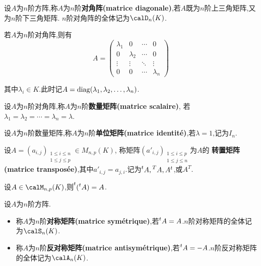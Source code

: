 \begin{deff}
    设$A$为$n$阶方阵,称$A$为$n$阶\textbf{对角阵(matrice diagonale)},若$A$既为$n$阶上三角矩阵,又为$n$阶下三角矩阵.
    $n$阶对角阵的全体记为$\calD_n(K)$.
\end{deff}

\begin{rqq}
    若$A$为$n$阶对角阵,则有
    \[ A = \begin{pmatrix}
        \lambda_{1} & 0 & \cdots & 0 \\
        0 & \lambda_{2} & \cdots & 0 \\
        \vdots & \vdots & \ddots & \vdots \\
        0 & 0 & \cdots & \lambda_{n}
    \end{pmatrix} \]

    其中$\lambda_i \in K$.此时记$A = \operatorname{diag}(\lambda_{1}, \lambda_{2}, \ldots, \lambda_{n})$.
\end{rqq}

\begin{deff}
    设$A$为$n$阶对角阵,称$A$为$n$阶\textbf{数量矩阵(matrice scalaire)},
    若$\lambda_{1} = \lambda_{2} = \cdots = \lambda_{n} = \lambda$.
\end{deff}

\begin{deff}
    设$A$为$n$阶数量矩阵,称$A$为$n$阶\textbf{单位矩阵(matrice identité)},若$\lambda = 1$,记为$I_n$.
\end{deff}

\begin{deff}
    设$A = (a_{i, j})_{\substack{1 \leqslant i \leqslant n \\ 1 \leqslant j \leqslant p}} \in M_{n, p}(K)$,
    称矩阵$(a'_{i, j})_{\substack{1 \leqslant i \leqslant p \\ 1 \leqslant j \leqslant n}}$为$A$的
    \textbf{转置矩阵(matrice transposée)},其中$a'_{i, j} = a_{j, i}$.记为$\prescript{t}{}{A}, \prescript{T}{}{A}, A^t$,或$A^T$.
\end{deff}

\begin{prop}
    设$A \in \calM_{n, p}(K)$,则$\prescript{t}{}{(\prescript{t}{}{A})} = A$.
\end{prop}

\begin{deff}
    设$A$为$n$阶方阵.
    \begin{itemize}
        \item 称$A$为$n$阶\textbf{对称矩阵(matrice symétrique)},若$\prescript{t}{}{A} = A$.$n$阶对称矩阵的全体记为$\calS_n(K)$.
        \item 称$A$为$n$阶\textbf{反对称矩阵(matrice antisymétrique)},若$\prescript{t}{}{A} = -A$.$n$阶反对称矩阵的全体记为$\calA_n(K)$.
    \end{itemize}
\end{deff}

